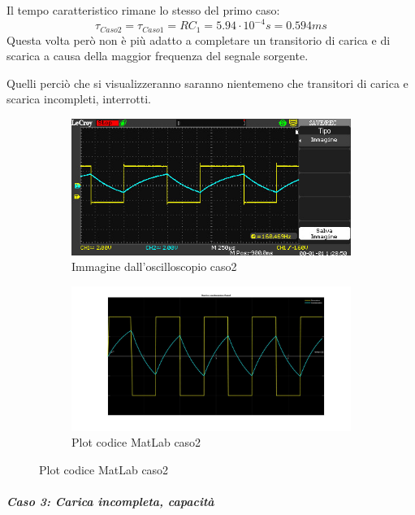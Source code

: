 \documentclass[a4paper, 12pt, twoside]{report}
\begin{document}
{ Il tempo caratteristico rimane lo stesso del primo caso:
 \[
 \tau_{Caso2}=\tau_{Caso1}=RC_{1}=5.94\cdot10^{-4}s =0.594ms
 \]
Questa volta però non è più adatto a completare un transitorio di carica e di scarica a causa della maggior frequenza del segnale sorgente. 

Quelli perciò che si visualizzeranno saranno nientemeno che transitori di carica e scarica incompleti, interrotti. 
   
  \begin{figure}[H]
  	\begin{subfigure}{1\textwidth}
  		\centering
  		\includegraphics[width=1\linewidth]{Esperienza/ImmaginiOscilloscopio/Caso2}  
  		\caption{Immagine dall'oscilloscopio caso2}
  		\label{fig:sub3}
  	\end{subfigure}
  	\begin{subfigure}{1\textwidth}
  		\centering
  		\includegraphics[width=1\linewidth]{Esperienza/MLcaso2}
  		\caption{Plot codice MatLab caso2}
  		\label{fig:sub4}
  	\end{subfigure}
  \end{figure}
   
   \subparagraph{Caso 3: Carica incompleta, capacità} \mbox{} \newline
    
}
\end{document}
